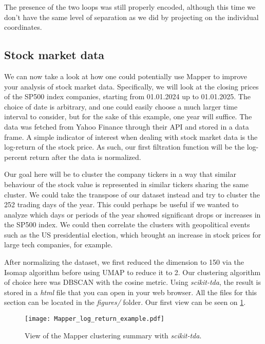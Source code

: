 The presence of the two loops was still properly encoded, although this time we don't have the same level of separation as we did by projecting on the individual coordinates.

\subsection{Stock market data}
We can now take a look at how one could potentially use Mapper to improve your analysis of stock market data. Specifically, we will look at the closing prices of the SP500 index companies, starting from 01.01.2024 up to 01.01.2025. The choice of date is arbitrary, and one could easily choose a much larger time interval to consider, but for the sake of this example, one year will suffice. The data was fetched from Yahoo Finance through their API and stored in a data frame. A simple indicator of interest when dealing with stock market data is the log-return of the stock price. As such, our first filtration function will be the log-percent return after the data is normalized.

Our goal here will be to cluster the company tickers in a way that similar behaviour of the stock value is represented in similar tickers sharing the same cluster. We could take the transpose of our dataset instead and try to cluster the 252 trading days of the year. This could perhaps be useful if we wanted to analyze which days or periods of the year showed significant drops or increases in the SP500 index. We could then correlate the clusters with geopolitical events such as the US presidential election, which brought an increase in stock prices for large tech companies, for example.

After normalizing the dataset, we first reduced the dimension to 150 via the Isomap algorithm before using UMAP to reduce it to 2. Our clustering algorithm of choice here was DBSCAN with the cosine metric. Using \textit{scikit-tda}, the result is stored in a \textit{html} file that you can open in your web browser. All the files for this section can be located in the \textit{figures/} folder. Our first view can be seen on \ref{fig:mapper_log_return}.

\begin{figure}[h!]
  \centering
  \texttt{[image: Mapper\_log\_return\_example.pdf]}
  \caption{View of the Mapper clustering summary with \textit{scikit-tda}.}
  \label{fig:mapper_log_return}
\end{figure}

